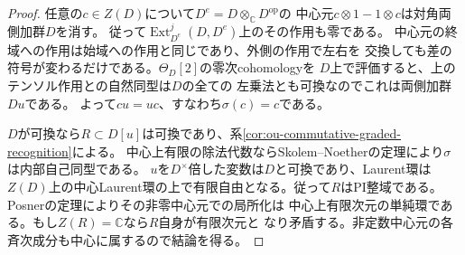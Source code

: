 \documentclass[11pt,a4paper]{ltjsarticle}
\theoremstyle{definition}
\begin{document}
\begin{proof}
任意の$c\in Z(D)$について$D^e=D\otimes_{\mathbb C}D^{\mathrm{op}}$の
中心元$c\otimes1-1\otimes c$は対角両側加群$D$を消す。
従って$\operatorname{Ext}^j_{D^e}(D,D^e)$上のその作用も零である。
中心元の終域への作用は始域への作用と同じであり、外側の作用で左右を
交換しても差の符号が変わるだけである。$\Theta_D[2]$の零次cohomologyを
$D$上で評価すると、上のテンソル作用との自然同型は$D$の全ての
左乗法とも可換なのでこれは両側加群$Du$である。
よって$cu=uc$、すなわち$\sigma(c)=c$である。

$D$が可換なら$R\subset D[u]$は可換であり、系\ref{cor:ou-commutative-graded-recognition}による。
中心上有限の除法代数ならSkolem--Noetherの定理により$\sigma$は内部自己同型である。
$u$を$D^\times$倍した変数は$D$と可換であり、Laurent環は
$Z(D)$上の中心Laurent環の上で有限自由となる。従って$R$はPI整域である。
Posnerの定理\cite[Theorem~4.1]{BresarPI}によりその非零中心元での局所化は
中心上有限次元の単純環である。もし$Z(R)=\mathbb C$なら$R$自身が有限次元と
なり矛盾する。非定数中心元の各斉次成分も中心に属するので結論を得る。
\end{proof}
\end{document}

